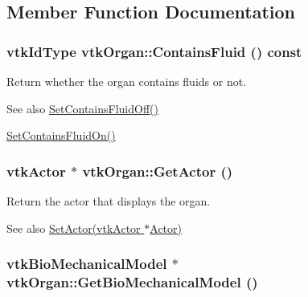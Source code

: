 \subsection{Member Function Documentation}
\hypertarget{classvtkOrgan_a180c5871366dca3c20ec81235ad0f618}{
\subsubsection[{ContainsFluid}]{\setlength{\rightskip}{0pt plus 5cm}vtkIdType vtkOrgan::ContainsFluid () const}}
\label{classvtkOrgan_a180c5871366dca3c20ec81235ad0f618}


Return whether the organ contains fluids or not. 

\begin{DoxySeeAlso}{See also}
\hyperlink{classvtkOrgan_a387870655644666d7e337071ebca3708}{SetContainsFluidOff()} 

\hyperlink{classvtkOrgan_a776239497bc5ca06cdea73d5dd572000}{SetContainsFluidOn()} 
\end{DoxySeeAlso}
\hypertarget{classvtkOrgan_af12bcf578df2448068251a80b08822c1}{
\subsubsection[{GetActor}]{\setlength{\rightskip}{0pt plus 5cm}vtkActor $\ast$ vtkOrgan::GetActor ()}}
\label{classvtkOrgan_af12bcf578df2448068251a80b08822c1}


Return the actor that displays the organ. 

\begin{DoxySeeAlso}{See also}
\hyperlink{classvtkOrgan_a7368fa68add5a80b7b80989df1894233}{SetActor(vtkActor $\ast$Actor)} 
\end{DoxySeeAlso}
\hypertarget{classvtkOrgan_a557162900b7880dac34acca512bcebd0}{
\subsubsection[{GetBioMechanicalModel}]{\setlength{\rightskip}{0pt plus 5cm}vtkBioMechanicalModel $\ast$ vtkOrgan::GetBioMechanicalModel ()}}
\label{classvtkOrgan_a557162900b7880dac34acca512bcebd0}


